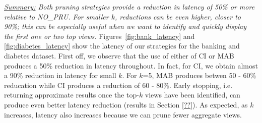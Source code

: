 

{\em \underline{Summary:} Both pruning strategies provide a reduction in latency of 50\% or more
relative to NO\_PRU. For smaller $k$, reductions can be even higher, closer to 90\%; this can be
especially useful when we want to identify and quickly display the first one or two top views.}
Figures~\ref{fig:bank_latency} and \ref{fig:diabetes_latency} show the latency
of our strategies for the banking and diabetes dataset.
First off, we observe that the use of either of CI or MAB produces a 50\% reduction in latency
throughout.
In fact, for CI, we obtain almost a 90\% reduction in latency for small $k$. 
For $k$=5, MAB produces betwen 50 - 60\% reducation while CI produces a reduction of 60 - 80\%.
Early stopping, i.e. returning approximate results once the top-$k$ views have been identified, 
can produce even better latency reduction (results in Section \ref{??}).
As expected, as $k$ increases, latency also increases because we can prune fewer aggregate views.

